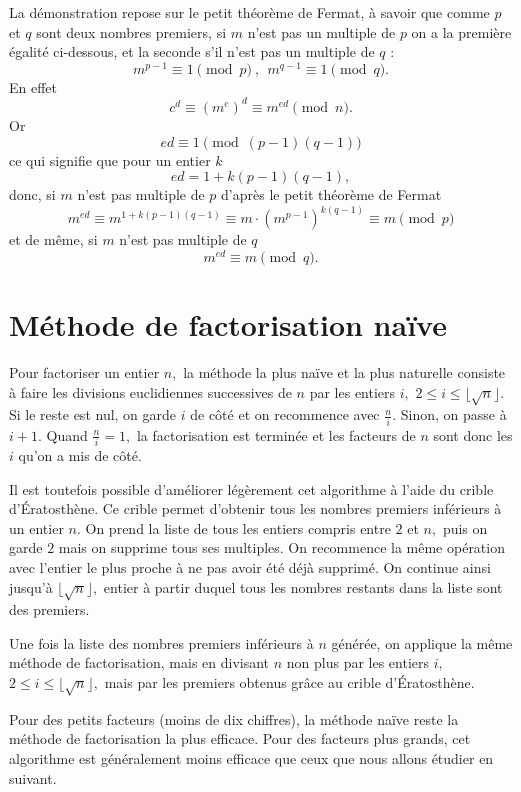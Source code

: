 \documentclass[french, 12pt, titlepage]{article}
\begin{document}
La démonstration repose sur le petit théorème de Fermat, à savoir que comme $p$ et $q$ sont deux nombres premiers, si $m$ n'est pas un multiple de $p$ on a la première égalité ci-dessous, et la seconde s'il n'est pas un multiple de $q$ :
\[ m^{p-1} \equiv 1 \pmod p\ ,\ \ m^{q-1} \equiv 1 \pmod q.\]
En effet
\[ c^d \equiv (m^e)^d \equiv m^{ed} \pmod n.\]
Or
\[ed \equiv 1 \pmod{(p-1)(q-1)}\]
ce qui signifie que pour un entier $k$
\[ed = 1 + k(p-1)(q-1),\]
donc, si $m$ n'est pas multiple de $p$ d'après le petit théorème de Fermat
\[m^{ed} \equiv m^{1+k(p-1)(q-1) }\equiv m\cdot \left(m^{p-1}\right)^{k(q-1)}\equiv m \pmod p\]
et de même, si $m$ n'est pas multiple de $q$
\[m^{ed}\equiv m \pmod q.\]

\section{Méthode de factorisation naïve}

Pour factoriser un entier $n,$ la méthode la plus naïve et la plus naturelle consiste à faire les divisions euclidiennes successives de $n$ par les entiers $i,$ $2 \leq i \leq \lfloor\sqrt{n}\rfloor.$ Si le reste est nul, on garde $i$ de côté et on recommence avec $\frac{n}{i}.$ Sinon, on passe à $i + 1.$ Quand $\frac{n}{i} = 1,$ la factorisation est terminée et les facteurs de $n$ sont donc les $i$ qu'on a mis de côté.

Il est toutefois possible d'améliorer légèrement cet algorithme à l'aide du crible d'{\'E}ratosthène. Ce crible permet d'obtenir tous les nombres premiers inférieurs à un entier $n.$
On prend la liste de tous les entiers compris entre $2$ et $n,$ puis on garde $2$ mais on supprime tous ses multiples. On recommence la même opération avec l'entier le plus proche à ne pas avoir été déjà supprimé.
On continue ainsi jusqu'à $\lfloor\sqrt{n}\rfloor,$ entier à partir duquel tous les nombres restants dans la liste sont des premiers.

Une fois la liste des nombres premiers inférieurs à $n$ générée, on applique la même méthode de factorisation, mais en divisant $n$ non plus par les entiers $i,$ $2 \leq i \leq \lfloor\sqrt{n}\rfloor,$
mais par les premiers obtenus grâce au crible d'{\'E}ratosthène.

Pour des petits facteurs (moins de dix chiffres), la méthode naïve reste la méthode de factorisation la plus efficace. Pour des facteurs plus grands, cet algorithme est généralement moins efficace
que ceux que nous allons étudier en suivant.
\end{document}
